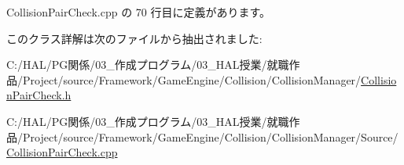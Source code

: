  Collision\+Pair\+Check.\+cpp の 70 行目に定義があります。



このクラス詳解は次のファイルから抽出されました\+:\begin{DoxyCompactItemize}
\item 
C\+:/\+H\+A\+L/\+P\+G関係/03\+\_\+作成プログラム/03\+\_\+\+H\+A\+L授業/就職作品/\+Project/source/\+Framework/\+Game\+Engine/\+Collision/\+Collision\+Manager/\mbox{\hyperlink{_collision_pair_check_8h}{Collision\+Pair\+Check.\+h}}\item 
C\+:/\+H\+A\+L/\+P\+G関係/03\+\_\+作成プログラム/03\+\_\+\+H\+A\+L授業/就職作品/\+Project/source/\+Framework/\+Game\+Engine/\+Collision/\+Collision\+Manager/\+Source/\mbox{\hyperlink{_collision_pair_check_8cpp}{Collision\+Pair\+Check.\+cpp}}\end{DoxyCompactItemize}
